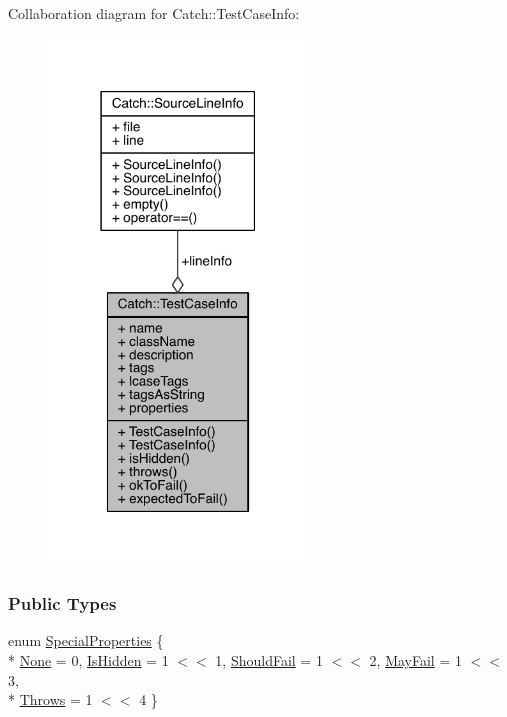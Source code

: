 Collaboration diagram for Catch\+:\+:Test\+Case\+Info\+:\nopagebreak
\begin{figure}[H]
\begin{center}
\leavevmode
\includegraphics[width=195pt]{a00287}
\end{center}
\end{figure}
\subsubsection*{Public Types}
\begin{DoxyCompactItemize}
\item 
enum \hyperlink{a00086_a39b232f74b4a7a6f2183b96759027eac}{Special\+Properties} \{ \\*
\hyperlink{a00086_a39b232f74b4a7a6f2183b96759027eacaf94e9de5f8ec1e53b1aa761ec564b31a}{None} = 0, 
\hyperlink{a00086_a39b232f74b4a7a6f2183b96759027eacaeda53906c14c3973e0980900c132b8f7}{Is\+Hidden} = 1 $<$$<$ 1, 
\hyperlink{a00086_a39b232f74b4a7a6f2183b96759027eacaf9002285bccfc343935958f3953f4c01}{Should\+Fail} = 1 $<$$<$ 2, 
\hyperlink{a00086_a39b232f74b4a7a6f2183b96759027eacadf1873d3271121cb9f52d7df45b416ca}{May\+Fail} = 1 $<$$<$ 3, 
\\*
\hyperlink{a00086_a39b232f74b4a7a6f2183b96759027eaca4704adf89ed7f7ad653d08f99813a974}{Throws} = 1 $<$$<$ 4
 \}
\end{DoxyCompactItemize}
